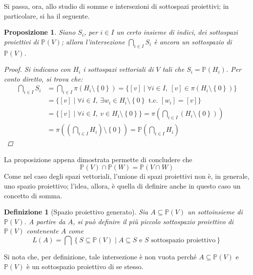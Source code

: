 \documentclass[11pt, a4paper]{scrartcl}
\theoremstyle{style1}
\newtheorem{prop}{Proposizione}[section]
\newtheorem{definizione}{Definizione}[section]
\numberwithin{equation}{subsection}
\begin{document}
Si passa, ora, allo studio di somme e intersezioni di sottospazi proiettivi; in particolare, si ha il seguente.
\begin{prop}
	Siano $S_i$, per $i \in I$ un certo insieme di indici, dei sottospazi proiettivi di $\mathbb{P}(V)$; allora l'intersezione $\bigcap_{i \in I} S_i$ \`e ancora un sottospazio di $\mathbb{P}(V)$.
	\begin{proof}
		Si indicano con $H_i$ i sottospazi vettoriali di $V$ tali che $S_i = \mathbb{P}(H_i)$.
		Per conto diretto, si trova che:
		\[
		\begin{split}
			\bigcap_{i \in I} S_i &= \bigcap _{i\in I} \pi(H_i \setminus\left\{ 0 \right\} ) = \big\{[v]  \mid \forall i \in I, \ [v] \in \pi (H_i \setminus \left\{ 0 \right\} ) \big\}\\
					      &= \big\{[v]  \mid \forall i \in I, \ \exists w_i \in H_i \setminus\left\{ 0 \right\}\text{ t.c. } [w_i] = [v]\big\}\\
					      &=\big\{[v]  \mid \forall i \in I, \ v \in H_i \setminus\left\{ 0 \right\} \big\} = \pi \left(\bigcap_{i \in I} \left(H_i \setminus\left\{ 0 \right\}\right)  \right) \\
					      &= \pi \left(\left(\bigcap_{i \in I} H_i\right) \setminus\left\{ 0 \right\} \right) = \mathbb{P} \left(\bigcap_{i \in I} H_i\right) 
		\end{split}
		\] 
	\end{proof}
\end{prop}
\noindent La proposizione appena dimostrata permette di concludere che
\begin{equation}
	\mathbb{P}(V) \cap \mathbb{P}(W) = \mathbb{P}(V \cap W)
\end{equation}
Come nel caso degli spazi vettoriali, l'unione di spazi proiettivi non \`e, in generale, uno spazio proiettivo; l'idea, allora, \`e quella di definire anche in questo caso un concetto di somma.
\begin{definizione}
	[Spazio proiettivo generato]
	Sia $A \subseteq \mathbb{P}(V)$ un sottoinsieme di $\mathbb{P}(V)$.
	A partire da $A$, si pu\`o definire il pi\`u piccolo sottospazio proiettivo di $\mathbb{P}(V)$ contenente $A$ come
	\[
		L(A) = \bigcap \left\{ S \subseteq \mathbb{P}(V)  \mid A\subseteq S \text{ e } S \text{ sottospazio proiettivo} \right\} 
	\]
\end{definizione}
\noindent Si nota che, per definizione, tale intersezione \`e non vuota perch\'e $A \subseteq \mathbb{P}(V)$ e $\mathbb{P}(V)$ \`e un sottospazio proiettivo di se stesso.
\end{document}
